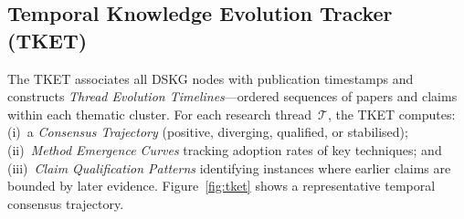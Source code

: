\documentclass{llncs}
\begin{document}
\subsection{Temporal Knowledge Evolution Tracker (TKET)}

The TKET associates all DSKG nodes with publication timestamps and constructs
\textit{Thread Evolution Timelines}—ordered sequences of papers and claims
within each thematic cluster. For each research thread~$\mathcal{T}$, the
TKET computes: (i)~a \textit{Consensus Trajectory} (positive, diverging,
qualified, or stabilised); (ii)~\textit{Method Emergence Curves} tracking
adoption rates of key techniques; and (iii)~\textit{Claim Qualification
Patterns} identifying instances where earlier claims are bounded by later
evidence. Figure~\ref{fig:tket} shows a representative temporal consensus
trajectory.
\end{document}
